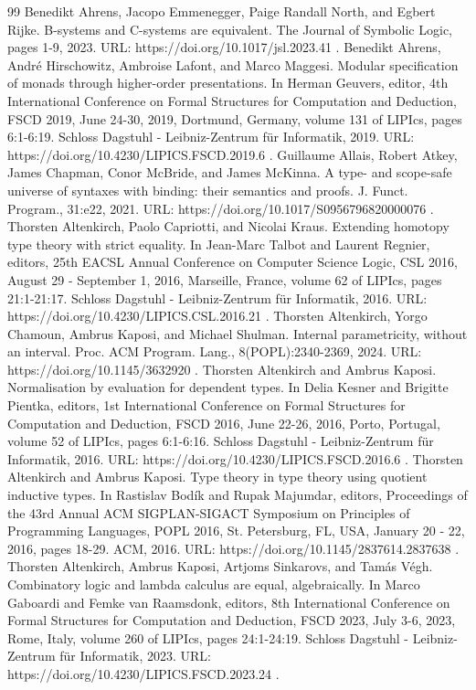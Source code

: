 \documentclass[10pt,a4paper]{amsart}
\begin{document}
\begin{thebibliography}{99}
 Benedikt Ahrens, Jacopo Emmenegger, Paige Randall North, and Egbert Rijke. B-systems and C-systems are equivalent. The Journal of Symbolic Logic, pages 1-9, 2023. URL: https://doi.org/10.1017/jsl.2023.41 .
 Benedikt Ahrens, André Hirschowitz, Ambroise Lafont, and Marco Maggesi. Modular specification of monads through higher-order presentations. In Herman Geuvers, editor, 4th International Conference on Formal Structures for Computation and Deduction, FSCD 2019, June 24-30, 2019, Dortmund, Germany, volume 131 of LIPIcs, pages 6:1-6:19. Schloss Dagstuhl - Leibniz-Zentrum für Informatik, 2019. URL: https://doi.org/10.4230/LIPICS.FSCD.2019.6 .
 Guillaume Allais, Robert Atkey, James Chapman, Conor McBride, and James McKinna. A type- and scope-safe universe of syntaxes with binding: their semantics and proofs. J. Funct. Program., 31:e22, 2021. URL: https://doi.org/10.1017/S0956796820000076 .
 Thorsten Altenkirch, Paolo Capriotti, and Nicolai Kraus. Extending homotopy type theory with strict equality. In Jean-Marc Talbot and Laurent Regnier, editors, 25th EACSL Annual Conference on Computer Science Logic, CSL 2016, August 29 - September 1, 2016, Marseille, France, volume 62 of LIPIcs, pages 21:1-21:17. Schloss Dagstuhl - Leibniz-Zentrum für Informatik, 2016. URL: https://doi.org/10.4230/LIPICS.CSL.2016.21 .
 Thorsten Altenkirch, Yorgo Chamoun, Ambrus Kaposi, and Michael Shulman. Internal parametricity, without an interval. Proc. ACM Program. Lang., 8(POPL):2340-2369, 2024. URL: https://doi.org/10.1145/3632920 .
 Thorsten Altenkirch and Ambrus Kaposi. Normalisation by evaluation for dependent types. In Delia Kesner and Brigitte Pientka, editors, 1st International Conference on Formal Structures for Computation and Deduction, FSCD 2016, June 22-26, 2016, Porto, Portugal, volume 52 of LIPIcs, pages 6:1-6:16. Schloss Dagstuhl - Leibniz-Zentrum für Informatik, 2016. URL: https://doi.org/10.4230/LIPICS.FSCD.2016.6 .
 Thorsten Altenkirch and Ambrus Kaposi. Type theory in type theory using quotient inductive types. In Rastislav Bodík and Rupak Majumdar, editors, Proceedings of the 43rd Annual ACM SIGPLAN-SIGACT Symposium on Principles of Programming Languages, POPL 2016, St. Petersburg, FL, USA, January 20 - 22, 2016, pages 18-29. ACM, 2016. URL: https://doi.org/10.1145/2837614.2837638 .
 Thorsten Altenkirch, Ambrus Kaposi, Artjoms Sinkarovs, and Tamás Végh. Combinatory logic and lambda calculus are equal, algebraically. In Marco Gaboardi and Femke van Raamsdonk, editors, 8th International Conference on Formal Structures for Computation and Deduction, FSCD 2023, July 3-6, 2023, Rome, Italy, volume 260 of LIPIcs, pages 24:1-24:19. Schloss Dagstuhl - Leibniz-Zentrum für Informatik, 2023. URL: https://doi.org/10.4230/LIPICS.FSCD.2023.24 .

\end{thebibliography}
\end{document}
